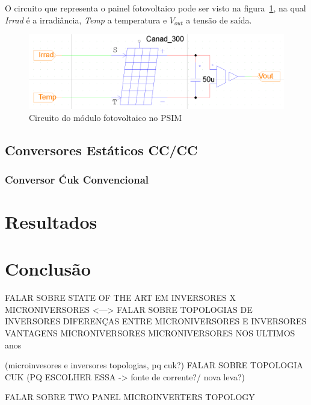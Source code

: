 \documentclass[
	12pt,				%
	openright,			%
	onseside,
	a4paper,			%
	english,			%
	french,				%
	spanish,			%
	brazil,				%
	]{abntex2}
\begin{document}
O circuito que representa o painel fotovoltaico pode ser visto na figura~\ref{fig:pv_psim_circuit}, na qual \textit{Irrad} é a irradiância, \textit{Temp} a temperatura e \emph{$V_{out}$} a tensão de saída.

\begin{figure}[]%
	\begin{center}%
		\includegraphics[width=0.55 \linewidth]{pv_psim_circuit}
		\caption{Circuito do módulo fotovoltaico no PSIM}
		\label{fig:pv_psim_circuit}
	\end{center}
\end{figure}

\section{Conversores Estáticos CC/CC}

\subsection{Conversor Ćuk Convencional}



\chapter{Resultados}

\chapter{Conclusão}

FALAR SOBRE  STATE OF THE ART EM INVERSORES X MICRONIVERSORES <---> FALAR SOBRE TOPOLOGIAS DE INVERSORES
DIFERENÇAS ENTRE MICRONIVERSORES E INVERSORES
VANTAGENS MICRONIVERSORES
MICRONIVERSORES NOS ULTIMOS anos

(microinvesores e inversores topologias, pq cuk?)
FALAR SOBRE TOPOLOGIA CUK (PQ ESCOLHER ESSA -> fonte de corrente?/ nova leva?)


	FALAR SOBRE TWO PANEL MICROINVERTERS TOPOLOGY
\end{document}
